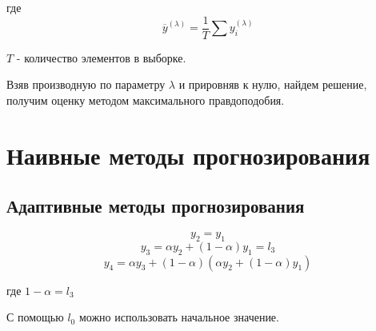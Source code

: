 \documentclass[aps,%
12pt,%
final,%
oneside,
onecolumn,%
musixtex, %
superscriptaddress,%
centertags]{article} %
\begin{document}
где $$\overline{y}^{(\lambda)} = \frac{1}{T} \sum y_i^{(\lambda)} $$

$ T $ - количество элементов в выборке.


Взяв производную по параметру $\lambda$ и прировняв к нулю, найдем решение, получим оценку методом максимального правдоподобия.
\section{Наивные методы прогнозирования}
\subsection{Адаптивные методы прогнозирования}
$$ y_2 = y_1$$
$$y_3 = \alpha y_2+(1-\alpha)y_1 = l_3$$
$$y_4 = \alpha y_3 + (1-\alpha)(\alpha y_2 + (1-\alpha)y_1) $$

где $1-\alpha=l_3$

С помощью $l_0$ можно использовать начальное значение. 
\end{document}

